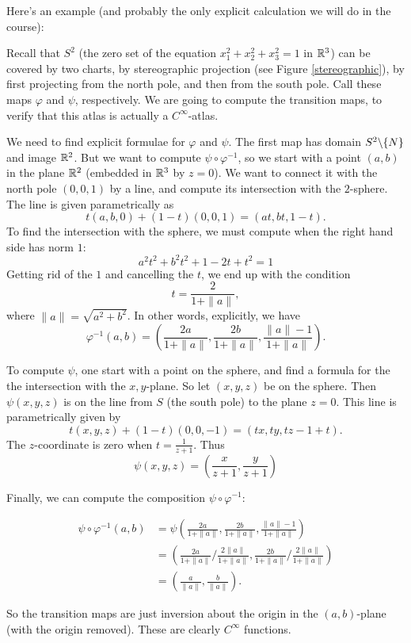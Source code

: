 \documentclass[11pt, english]{article}
\begin{document}
Here's an example (and probably the only explicit calculation we will do in the course):

\begin{example}
Recall that $S^2$ (the zero set of the equation $x_1^2+x_2^2+x_3^2=1$ in $\mathbb{R}^3$) can be covered by two charts, by stereographic projection (see Figure \ref{stereographic}), by first projecting from the north pole, and then from the south pole. Call these maps $\varphi$ and $\psi$, respectively. We are going to compute the transition maps, to verify that this atlas is actually a $C^\infty$-atlas.

We need to find explicit formulae for $\varphi$ and $\psi$. The first map has domain $S^2 \backslash \{ N \}$ and image $\mathbb{R}^2$. But we want to compute $\psi \circ \varphi^{-1}$, so we start with a point $(a,b)$ in the plane $\mathbb{R}^2$ (embedded in $\mathbb{R}^3$ by $z=0$). We want to connect it with the north pole $(0,0,1)$ by a line, and compute its intersection with the $2$-sphere. The line is given parametrically as \[t(a,b,0)+(1-t)(0,0,1)=(at,bt,1-t).\]
To find the intersection with the sphere, we must compute when the right hand side has norm $1$:
\[
a^2 t^2+b^2 t^2+1-2t+t^2 = 1
\]
Getting rid of the $1$ and cancelling the $t$, we end up with the condition
\[
t = \frac{2}{1+\| a \|},
\]
where $\| a \| = \sqrt{a^2 + b^2}$. In other words, explicitly, we have
\[
\varphi^{-1}(a,b) = \left(\frac{2a}{1+\|a\|},\frac{2b}{1+\|a\|},\frac{\|a \| -1}{1+\|a\|}\right).
\]

To compute $\psi$, one start with a point on the sphere, and find a formula for the the intersection with the $x,y$-plane. So let $(x,y,z)$ be on the sphere. Then $\psi(x,y,z)$ is on the line from $S$ (the south pole) to the plane $z=0$. This line is parametrically given by
\[
t(x,y,z) +(1-t)(0,0,-1) = (tx,ty,tz-1+t).
\]
The $z$-coordinate is zero when $t=\frac{1}{z+1}$. Thus
\[
\psi(x,y,z) = \left( \frac{x}{z+1}, \frac{y}{z+1} \right)
\]

Finally, we can compute the composition $\psi \circ \varphi^{-1}$:

\begin{align*}
\psi \circ \varphi^{-1}(a,b) &= \psi\left(\frac{2a}{1+\|a\|},\frac{2b}{1+\|a\|},\frac{\|a \| -1}{1+\|a\|}\right) \\
&= \left (\frac{2a}{1+\| a \|} \big / \frac{2 \| a \|}{1+\| a \|},\frac{2b}{1+\| a \|} \big / \frac{2 \| a \|}{1+\| a \|}   \right) \\
&= \left ( \frac{a}{\| a \|} , \frac{b}{\| a \|}\right).
\end{align*}

So the transition maps are just inversion about the origin in the $(a,b)$-plane (with the origin removed). These are clearly $C^\infty$ functions.
\end{example}
\end{document}
